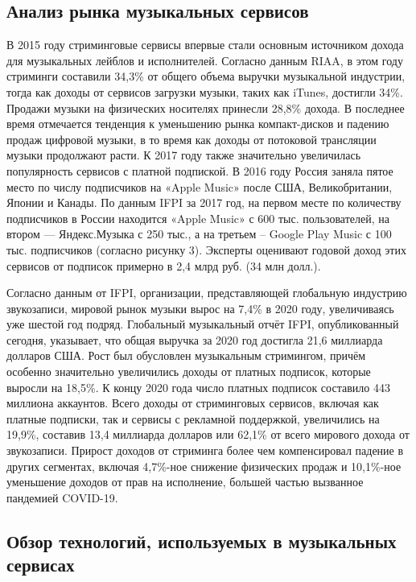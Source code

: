 \subsection{Анализ рынка музыкальных сервисов}

В 2015 году стриминговые сервисы впервые стали основным источником дохода для музыкальных лейблов и исполнителей. Согласно данным RIAA, в этом году стриминги составили 34,3\% от общего объема выручки музыкальной индустрии, тогда как доходы от сервисов загрузки музыки, таких как iTunes, достигли 34\%. Продажи музыки на физических носителях принесли 28,8\% дохода.
В последнее время отмечается тенденция к уменьшению рынка компакт-дисков и падению продаж цифровой музыки, в то время как доходы от потоковой трансляции музыки продолжают расти. К 2017 году также значительно увеличилась популярность сервисов с платной подпиской. В 2016 году Россия заняла пятое место по числу подписчиков на «Apple Music» после США, Великобритании, Японии и Канады. По данным IFPI за 2017 год, на первом месте по количеству подписчиков в России находится «Apple Music» с 600 тыс. пользователей, на втором — Яндекс.Музыка с 250 тыс., а на третьем -- Google Play Music с 100 тыс. подписчиков (согласно рисунку 3). Эксперты оценивают годовой доход этих сервисов от подписок примерно в 2,4 млрд руб. (34 млн долл.)\cite{mus2}.

Согласно данным от IFPI, организации, представляющей глобальную индустрию звукозаписи, мировой рынок музыки вырос на 7,4\% в 2020 году, увеличиваясь уже шестой год подряд. Глобальный музыкальный отчёт IFPI, опубликованный сегодня, указывает, что общая выручка за 2020 год достигла 21,6 миллиарда долларов США.
Рост был обусловлен музыкальным стримингом, причём особенно значительно увеличились доходы от платных подписок, которые выросли на 18,5\%. К концу 2020 года число платных подписок составило 443 миллиона аккаунтов. Всего доходы от стриминговых сервисов, включая как платные подписки, так и сервисы с рекламной поддержкой, увеличились на 19,9\%, составив 13,4 миллиарда долларов или 62,1\% от всего мирового дохода от звукозаписи. Прирост доходов от стриминга более чем компенсировал падение в других сегментах, включая 4,7\%-ное снижение физических продаж и 10,1\%-ное уменьшение доходов от прав на исполнение, большей частью вызванное пандемией COVID-19\cite{ifpi}.

\subsection{Обзор технологий, используемых в музыкальных сервисах}

